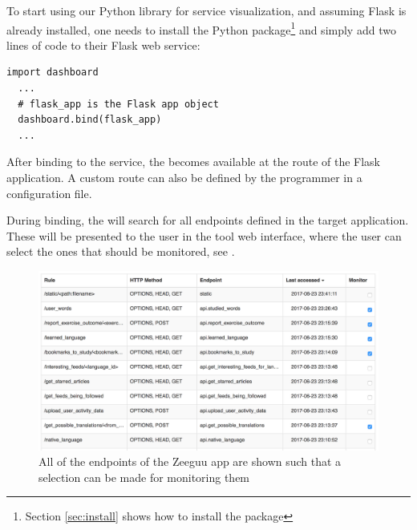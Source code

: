 \documentclass[conference]{IEEEtran}
\begin{document}
  To start using our Python library for service visualization, and assuming Flask is already installed, one needs to install the Python package\footnote{Section \ref{sec:install} shows how to install the package} 
  and simply add two lines of code to their Flask web service:

  \begin{lstlisting}[style=custompython]
  import dashboard
  ...
  # flask_app is the Flask app object
  dashboard.bind(flask_app)
  ...
  \end{lstlisting}



  After binding to the service, the \tool becomes available at the  route of the Flask application. A custom route can also be defined by the programmer in a configuration file.

  During binding, the \tool will search for all endpoints defined in the target application. These will be presented to the user in the tool web interface, where the user can select the ones that should be monitored, see . 

    \begin{figure}[h!]
      \centering
      \includegraphics[width=\linewidth]{selecting_endpoints.png}
      \caption{All of the endpoints of the Zeeguu app are shown such that a selection can be made for monitoring them}
      \label{fig:sep}
    \end{figure}
\end{document}
